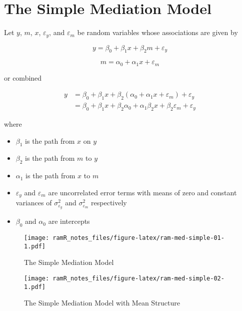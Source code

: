\documentclass[
]{book}
\providecommand{\tightlist}{%
  \setlength{\itemsep}{0pt}\setlength{\parskip}{0pt}}
\theoremstyle{definition}
\theoremstyle{definition}
\theoremstyle{definition}
\theoremstyle{remark}
\begin{document}
\hypertarget{ram-med-simple}{%
\chapter{The Simple Mediation Model}\label{ram-med-simple}}

Let \(y\), \(m\), \(x\), \(\varepsilon_y\), and \(\varepsilon_m\) be random variables
whose associations are given by

\begin{equation}
  y = \beta_0 + \beta_1 x + \beta_2 m + \varepsilon_y
\end{equation}

\begin{equation}
  m = \alpha_0 + \alpha_1 x + \varepsilon_m
\end{equation}

or combined

\begin{equation}
  \begin{split}
    y
    &=
    \beta_0
    + \beta_1 x
    + \beta_2 (\alpha_0 + \alpha_1 x + \varepsilon_m)
    + \varepsilon_y \\
    &=
    \beta_0
    + \beta_1 x
    + \beta_2 \alpha_0
    + \alpha_1 \beta_2 x
    + \beta_2 \varepsilon_m
    + \varepsilon_y
  \end{split}
\end{equation}

where

\begin{itemize}
\tightlist
\item
  \(\beta_1\) is the path from \(x\) on \(y\)
\item
  \(\beta_2\) is the path from \(m\) to \(y\)
\item
  \(\alpha_1\) is the path from \(x\) to \(m\)
\item
  \(\varepsilon_y\) and \(\varepsilon_m\) are uncorrelated error terms
  with means of zero and constant variances of \(\sigma_{\varepsilon_y}^{2}\) and
  \(\sigma_{\varepsilon_m}^{2}\) respectively
\item
  \(\beta_0\) and \(\alpha_0\) are intercepts
\end{itemize}

\begin{figure}
\centering
\texttt{[image: ramR\_notes\_files/figure-latex/ram-med-simple-01-1.pdf]}
\caption{\label{fig:ram-med-simple-01}The Simple Mediation Model}
\end{figure}

\begin{figure}
\centering
\texttt{[image: ramR\_notes\_files/figure-latex/ram-med-simple-02-1.pdf]}
\caption{\label{fig:ram-med-simple-02}The Simple Mediation Model with Mean Structure}
\end{figure}
\end{document}
